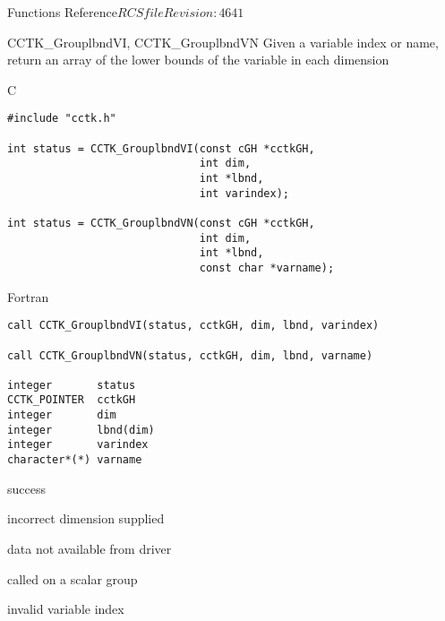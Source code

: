 \begin{cactuspart}{ Functions Reference}{$RCSfile$}{$Revision: 4641 $}
\begin{FunctionDescription}{CCTK\_GrouplbndVI, CCTK\_GrouplbndVN}
\label{CCTK-GrouplbndVI}
\label{CCTK-GrouplbndVN}
Given a variable index or name, return an array of the lower bounds of the variable in each dimension

\begin{SynopsisSection}
\begin{Synopsis}{C}
\begin{verbatim}
#include "cctk.h"

int status = CCTK_GrouplbndVI(const cGH *cctkGH,
                              int dim,
                              int *lbnd,
                              int varindex);

int status = CCTK_GrouplbndVN(const cGH *cctkGH,
                              int dim,
                              int *lbnd,
                              const char *varname);
\end{verbatim}
\end{Synopsis}
\begin{Synopsis}{Fortran}
\begin{verbatim}
call CCTK_GrouplbndVI(status, cctkGH, dim, lbnd, varindex)

call CCTK_GrouplbndVN(status, cctkGH, dim, lbnd, varname)

integer       status
CCTK_POINTER  cctkGH
integer       dim
integer       lbnd(dim)
integer       varindex
character*(*) varname
\end{verbatim}
\end{Synopsis}
\end{SynopsisSection}

\begin{ResultSection}
\begin{Result}{0} success \end{Result}
\begin{Result}{-1} incorrect dimension supplied \end{Result}
\begin{Result}{-2} data not available from driver \end{Result}
\begin{Result}{-3} called on a scalar group \end{Result}
\begin{Result}{-4} invalid variable index \end{Result}
\end{ResultSection}


\end{FunctionDescription}
\end{cactuspart}
